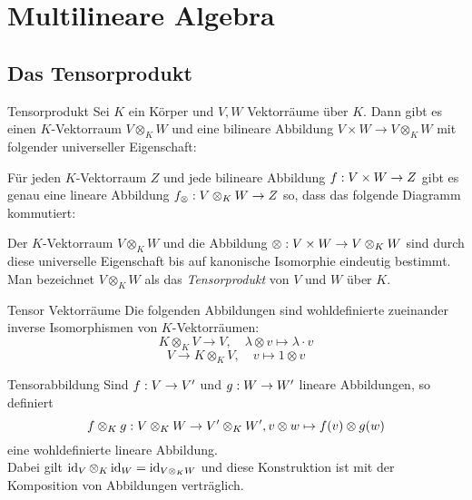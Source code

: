 \documentclass[main.tex]{subfiles}
\begin{document}
\section*{Multilineare Algebra}
\subsection*{Das Tensorprodukt}

\begin{karte}{Tensorprodukt}
    Sei \( K \) ein Körper und \( V,W \) Vektorräume über 
    \( K \). Dann gibt es einen \(K\)-Vektorraum \( V \otimes_K W \) 
    und eine bilineare Abbildung \( V \times W \rightarrow V\otimes_K W \) 
    mit folgender universeller Eigenschaft:

    Für jeden \( K \)-Vektorraum \( Z \) und jede bilineare Abbildung 
    \( f : V\times W \rightarrow Z \) gibt es genau eine lineare Abbildung 
    \( f_\otimes : V\otimes_K W \rightarrow Z \) so, dass das folgende Diagramm kommutiert:
    \begin{center}
    \end{center}
    Der \( K \)-Vektorraum \( V \otimes_K W \) und die 
    Abbildung \( \otimes : V\times W \rightarrow V \otimes_K W \) 
    sind durch diese universelle Eigenschaft bis auf 
    kanonische Isomorphie eindeutig bestimmt. Man 
    bezeichnet \( V \otimes_K W \) als das \textit{Tensorprodukt} 
    von \( V \) und \(W\) über \(K\).
\end{karte}

\begin{karte}{Tensor Vektorräume}
    Die folgenden Abbildungen sind wohldefinierte zueinander inverse 
    Isomorphismen von \(K\)-Vektorräumen:
    \[ K\otimes_K V \rightarrow V, \quad \lambda \otimes v \mapsto \lambda \cdot v \]
    \[ V \rightarrow K \otimes_K V, \quad v \mapsto 1 \otimes v \]
\end{karte}

\begin{karte}{Tensorabbildung}
    Sind \( f : V \rightarrow V' \) und \( g : W \rightarrow W' \) 
    lineare Abbildungen, so definiert 
    \[  f \otimes_K g  : V \otimes_K W \rightarrow V' \otimes_K W', 
    v \otimes w \mapsto f(v) \otimes g(w) \]
    eine wohldefinierte lineare Abbildung.\\
    Dabei gilt \( \operatorname{id}_V \otimes_K \operatorname{id}_W = \operatorname{id}_{V \otimes_K W} \) 
    und diese Konstruktion ist mit der Komposition von Abbildungen 
    verträglich.
\end{karte}
\end{document}
